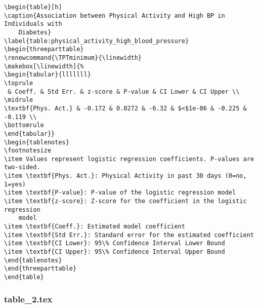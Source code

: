 \documentclass[11pt]{article}
\begin{document}
\begin{Verbatim}[tabsize=4]
\begin{table}[h]
\caption{Association between Physical Activity and High BP in Individuals with
	Diabetes}
\label{table:physical_activity_high_blood_pressure}
\begin{threeparttable}
\renewcommand{\TPTminimum}{\linewidth}
\makebox[\linewidth]{%
\begin{tabular}{lllllll}
\toprule
 & Coeff. & Std Err. & z-score & P-value & CI Lower & CI Upper \\
\midrule
\textbf{Phys. Act.} & -0.172 & 0.0272 & -6.32 & $<$1e-06 & -0.225 & -0.119 \\
\bottomrule
\end{tabular}}
\begin{tablenotes}
\footnotesize
\item Values represent logistic regression coefficients. P-values are two-sided.
\item \textbf{Phys. Act.}: Physical Activity in past 30 days (0=no, 1=yes)
\item \textbf{P-value}: P-value of the logistic regression model
\item \textbf{z-score}: Z-score for the coefficient in the logistic regression
	model
\item \textbf{Coeff.}: Estimated model coefficient
\item \textbf{Std Err.}: Standard error for the estimated coefficient
\item \textbf{CI Lower}: 95\% Confidence Interval Lower Bound
\item \textbf{CI Upper}: 95\% Confidence Interval Upper Bound
\end{tablenotes}
\end{threeparttable}
\end{table}

\end{Verbatim}

\subsubsection*{table\_2.tex}
\end{document}
